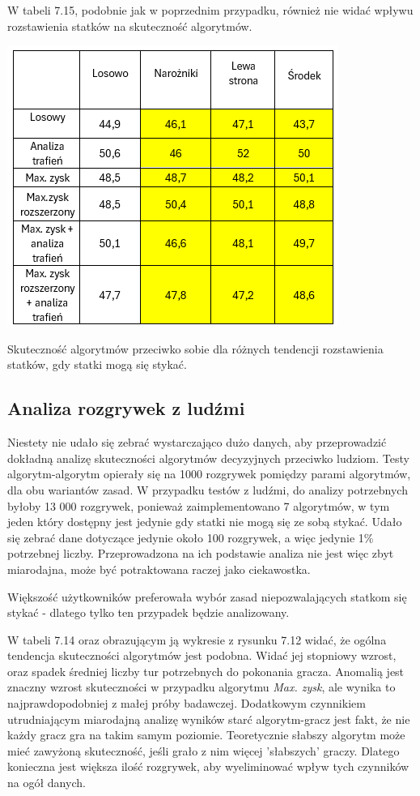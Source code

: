 W tabeli 7.15, podobnie jak w poprzednim przypadku, również nie widać wpływu rozstawienia statków na skuteczność algorytmów.

\begin{table}[!h]
    \label{fig:biases-can-touch}
    \centering \includegraphics[width=0.7\linewidth]{img/bias_result_can_touch.png}
    \caption{Skuteczność algorytmów przeciwko sobie dla różnych tendencji rozstawienia statków, gdy statki mogą się stykać.}
\end{table}

\subsection{Analiza rozgrywek z ludźmi}

Niestety nie udało się zebrać wystarczająco dużo danych, aby przeprowadzić dokładną analizę skuteczności algorytmów decyzyjnych przeciwko ludziom. Testy algorytm-algorytm opierały się na 1000 rozgrywek pomiędzy parami algorytmów, dla obu wariantów zasad. W przypadku testów z ludźmi, do analizy potrzebnych byłoby 13 000 rozgrywek, ponieważ zaimplementowano 7 algorytmów, w tym jeden który dostępny jest jedynie gdy statki nie mogą się ze sobą stykać. Udało się zebrać dane dotyczące jedynie około 100 rozgrywek, a więc jedynie 1\% potrzebnej liczby. Przeprowadzona na ich podstawie analiza nie jest więc zbyt miarodajna, może być potraktowana raczej jako ciekawostka.

Większość użytkowników preferowała wybór zasad niepozwalających statkom się stykać - dlatego tylko ten przypadek będzie analizowany.

W tabeli 7.14 oraz obrazującym ją wykresie z rysunku 7.12 widać, że ogólna tendencja skuteczności algorytmów jest podobna. Widać jej stopniowy wzrost, oraz spadek średniej liczby tur potrzebnych do pokonania gracza. Anomalią jest znaczny wzrost skuteczności w przypadku algorytmu \emph{Max. zysk}, ale wynika to najprawdopodobniej z małej próby badawczej. Dodatkowym czynnikiem utrudniającym miarodajną analizę wyników starć algorytm-gracz jest fakt, że nie każdy gracz gra na takim samym poziomie. Teoretycznie słabszy algorytm może mieć zawyżoną skuteczność, jeśli grało z nim  więcej 'słabszych' graczy. Dlatego konieczna jest większa ilość rozgrywek, aby wyeliminować wpływ tych czynników na ogół danych.

